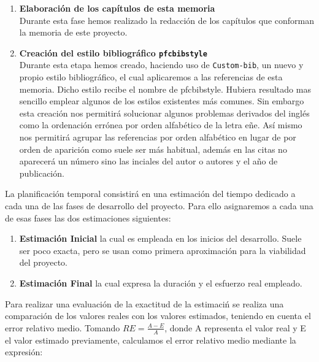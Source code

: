 \begin{enumerate}
			\item \textbf{Elaboraci\'on de los cap\'itulos de esta memoria}\\
						Durante esta fase hemos realizado la redacci\'on de los cap\'itulos que conforman la memoria de este proyecto. 
										  
			\item \textbf{Creaci\'on del estilo bibliogr\'afico \texttt{pfcbibstyle}}\\
						Durante esta etapa hemos creado, haciendo uso de \texttt{Custom-bib}, un nuevo y propio estilo bibliogr\'afico, 
						el cual aplicaremos a las referencias de esta memoria. Dicho estilo recibe el nombre de pfcbibstyle. Hubiera
						resultado mas sencillo emplear algunos de los estilos existentes m\'as comunes. Sin embargo esta creaci\'on
						nos permitir\'a solucionar algunos problemas derivados del ingl\'es como la ordenaci\'on err\'onea por orden
						alfab\'etico de la letra e\~ne. As\'i mismo nos permitir\'a agrupar las referencias por orden alfab\'etico
						en lugar de por orden de aparici\'on como suele ser m\'as habitual, adem\'as en las citas no aparecer\'a un
						n\'umero sino las inciales del autor o autores y el a\~no de publicaci\'on.  
			
\end{enumerate}


	La planificaci\'on temporal consistir\'a en una estimaci\'on del tiempo dedicado a cada una de las fases
	de desarrollo del proyecto. Para ello asignaremos a cada una de esas fases las dos estimaciones siguientes:
	
\begin{enumerate}
	\item \textbf{Estimaci\'on Inicial} la cual es empleada en los inicios del desarrollo. Suele ser poco exacta,
				pero se usan como primera aproximaci\'on para la viabilidad del proyecto.

	\item \textbf{Estimaci\'on Final} la cual expresa la duraci\'on y el esfuerzo real empleado.
\end{enumerate}
 
	Para realizar una evaluaci\'on de la exactitud de la estimaci\'n se realiza una comparaci\'on de los valores reales 
	con los valores estimados, teniendo en cuenta el error relativo medio. Tomando $RE =\frac{A - E}{A}$, donde A 
	representa el valor real y E el valor estimado previamente, calculamos el error relativo medio mediante la 
	expresi\'on: \\
	
